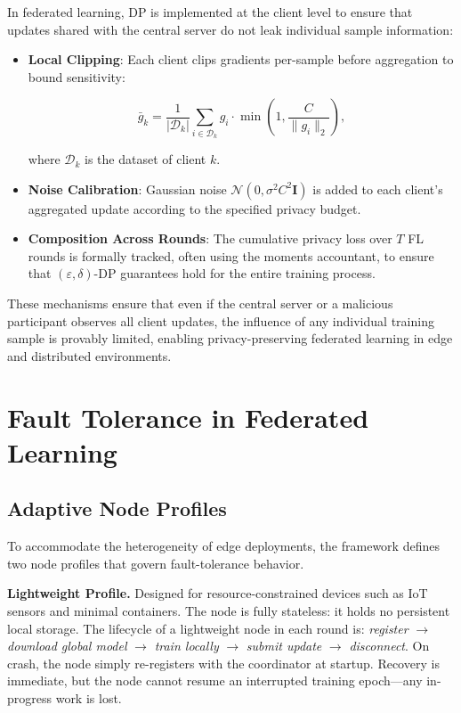 In federated learning, DP is implemented at the client level to ensure that updates 
shared with the central server do not leak individual sample information:

\begin{itemize}
    \item \textbf{Local Clipping}: Each client clips gradients per-sample before 
    aggregation to bound sensitivity:

    \begin{equation}
        \bar{g}_k = \frac{1}{|\mathcal{D}_k|} \sum_{i \in \mathcal{D}_k} 
        g_i \cdot \min \left(1, \frac{C}{\| g_i \|_2} \right),
    \end{equation}

    where $\mathcal{D}_k$ is the dataset of client $k$.

    \item \textbf{Noise Calibration}: Gaussian noise $\mathcal{N}(0, \sigma^2 C^2 \mathbf{I})$ 
    is added to each client’s aggregated update according to the specified 
    privacy budget.

    \item \textbf{Composition Across Rounds}: The cumulative privacy loss over 
    $T$ FL rounds is formally tracked, often using the moments accountant, to 
    ensure that $(\varepsilon, \delta)$-DP guarantees hold for the entire training 
    process.
\end{itemize}

These mechanisms ensure that even if the central server or a malicious participant 
observes all client updates, the influence of any individual training sample is 
provably limited, enabling privacy-preserving federated learning in edge and 
distributed environments.

\section{Fault Tolerance in Federated Learning}
\label{sec:fl_fault_tolerance}

\subsection{Adaptive Node Profiles}
\label{subsec:fl_node_profiles}

To accommodate the heterogeneity of edge deployments, the framework defines two
node profiles that govern fault-tolerance behavior.

\textbf{Lightweight Profile.} Designed for resource-constrained devices such as
IoT sensors and minimal containers. The node is fully stateless: it holds no
persistent local storage. The lifecycle of a lightweight node in each round is:
\emph{register} $\to$ \emph{download global model} $\to$ \emph{train locally}
$\to$ \emph{submit update} $\to$ \emph{disconnect}. On crash, the node simply
re-registers with the coordinator at startup. Recovery is immediate, but the
node cannot resume an interrupted training epoch---any in-progress work is lost.

